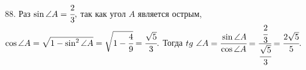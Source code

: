 88. Раз $\sin \angle A=\cfrac{2}{3},$ так как угол $A$ является острым, $\cos \angle A=\sqrt{1-\sin^2 \angle A}=\sqrt{1-\cfrac{4}{9}}=\cfrac{\sqrt{5}}{3}.$ Тогда $tg\ \angle A=\cfrac{\sin \angle A}{\cos \angle A}=\cfrac{\cfrac{2}{3}}{\cfrac{\sqrt{5}}{3}}=\cfrac{2\sqrt{5}}{5}.$\\
